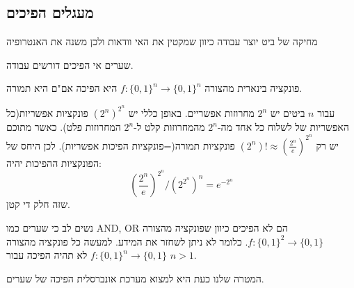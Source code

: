 \documentclass{tstextbook}
\begin{document}
\subsection{מעגלים הפיכים}

\begin{proposition}
מחיקה של ביט יוצר עבודה כיוון שמקטין את האי וודאות ולכן משנה את האנטרופיה

\end{proposition}
\begin{corollary}
שערים אי הפיכים דורשים עבודה.

\end{corollary}
\begin{proposition}
פונקציה בינארית מהצורה \(f:\{ 0,1 \}^{n}\to\{ 0,1 \}^{n}\) היא הפיכה אם"ם היא תמורה.

\end{proposition}
\begin{corollary}
עבור \(n\) ביטים יש \(2^{n}\) מחרוזות אפשריים.
באופן כללי יש \((2^{n})^{2^{n}}\) פונקציות אפשריות(כל האפשריות של לשלוח כל אחד מה-\(2^{n}\) מהמחרוזות קלט ל-\(2^{n}\) המחרוזות פלט). כאשר מתוכם יש רק \((2^{n})!\approx \left( \frac{2^{n}}{e} \right)^{2^{n}}\) פונקציות תמורה(=פונקציות הפיכות אפשריות). לכן היחס של הפונקציות ההפיכות יהיה:
$$\left({\frac{2^{n}}{e}}\right)^{2^{n}}/\left(2^{2^{n}}\right)^{n}=e^{-2^{n}}$$
שזה חלק די קטן.

\end{corollary}
\begin{remark}
נשים לב כי שערים כמו AND, OR הם לא הפיכים כיוון שפונקציה מהצורה \(f:\{ 0,1 \}^{2}\to\{ 0,1 \}\). כלומר לא ניתן לשחזר את המידע. למעשה כל פונקציה מהצורה \(f:\{ 0,1 \}^{n}\to \{ 0,1 \}\) לא תהיה הפיכה עבור \(n>1\).

\end{remark}
המטרה שלנו כעת היא למצוא מערכת אונברסלית הפיכה של שערים.
\end{document}
